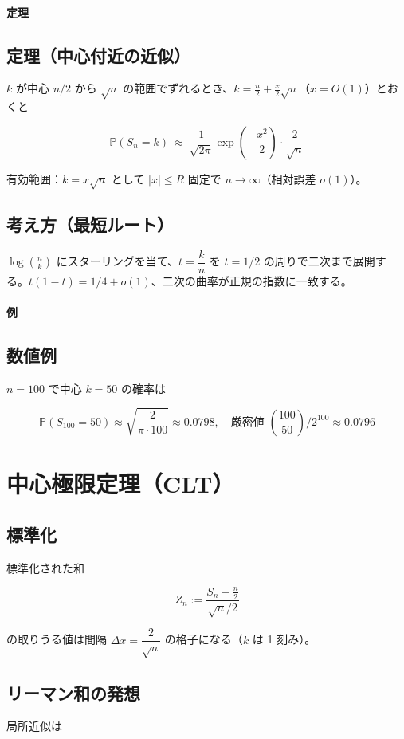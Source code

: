 \documentclass[uplatex,dvipdfmx,11pt,a4paper,openany]{bxjsbook}
\begin{document}
\paragraph{定理}
\subsection{定理（中心付近の近似）}
$k$ が中心 $n/2$ から $\sqrt n$ の範囲でずれるとき、$k=\tfrac{n}{2}+ \tfrac{x}{2}\sqrt n$（$x=O(1)$）とおくと

\[\mathbb P(S_n=k)\ \approx\ \frac{1}{\sqrt{2\pi}}\exp\!\left(-\frac{x^2}{2}\right)\cdot\frac{2}{\sqrt{n}}\]

有効範囲：$k=x\sqrt n$ として $|x|\le R$ 固定で $n\to\infty$（相対誤差 $o(1)$）。


\subsection{考え方（最短ルート）}
$\log\binom{n}{k}$ にスターリングを当て、$t=\dfrac{k}{n}$ を $t=1/2$ の周りで二次まで展開する。$t(1-t)=1/4+o(1)$、二次の曲率が正規の指数に一致する。

\paragraph{例}
\subsection{数値例}
$n=100$ で中心 $k=50$ の確率は

\[\mathbb P(S_{100}=50)\approx \sqrt{\frac{2}{\pi\cdot 100}}\approx 0.0798,\quad
            \text{厳密値 } \binom{100}{50}/2^{100}\approx 0.0796\]


\section{中心極限定理（CLT）}
\subsection{標準化}
標準化された和

\[Z_n := \frac{S_n-\tfrac{n}{2}}{\sqrt{n}/2}\]

の取りうる値は間隔 $\Delta x=\dfrac{2}{\sqrt n}$ の格子になる（$k$ は 1 刻み）。

\subsection{リーマン和の発想}
局所近似は
\end{document}
